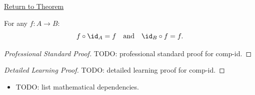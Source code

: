 \newpage
{}
\label{prf:comp-id}

\begin{remark*}[Return]
\hyperref[thm:comp-id]{Return to Theorem}
\end{remark*}

\begin{theorem*}
For any $f : A \to B$:
\[
f \circ \id_A = f
\quad\text{and}\quad
\id_B \circ f = f.
\]
\end{theorem*}

\begin{proof}[Professional Standard Proof]
\LRAProofBodyStart
TODO: professional standard proof for comp-id.
\end{proof}

\begin{proof}[Detailed Learning Proof]
\LRAProofBodyStart
TODO: detailed learning proof for comp-id.
\end{proof}

\begin{remark*}
\end{remark*}

\begin{dependencies}
\begin{itemize}
  \item TODO: list mathematical dependencies.
\end{itemize}
\end{dependencies}

\clearpage
